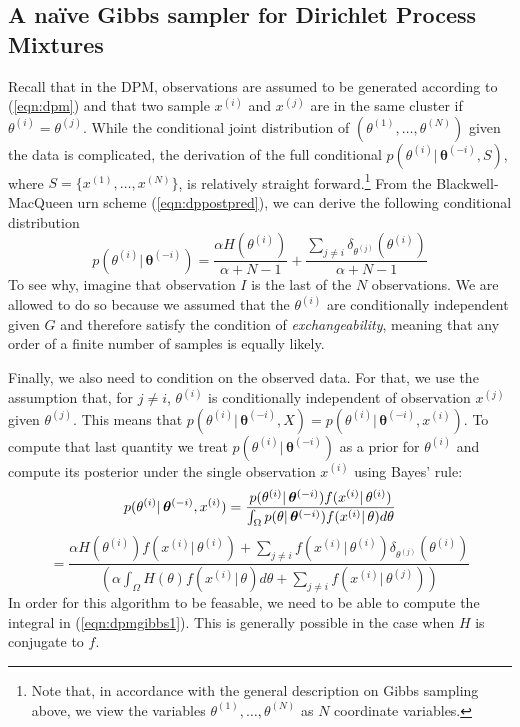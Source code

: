 \documentclass[final,3p,times,twocolumn]{elsarticle}
\let\bs\boldsymbol
\begin{document}
\subsection{A na{\"i}ve Gibbs sampler for Dirichlet Process Mixtures}
Recall that in the DPM, observations are assumed to be generated according to (\ref{eqn:dpm}) and that two sample $x^{(i)}$ and $x^{(j)}$ are in the same cluster if $\theta^{(i)}=\theta^{(j)}$.
While the conditional joint distribution of $(\theta^{(1)},\dots,\theta^{(N)})$ given the data is complicated, the derivation of the full conditional $p(\theta^{(i)}|\,\bs\theta^{(-i)},S)$, where $S=\{x^{(1)},\dots,x^{(N)}\}$, is relatively straight forward.\footnote{Note that, in accordance with the general description on Gibbs sampling above, we view the variables $\theta^{(1)},\dots,\theta^{(N)}$ as $N$ coordinate variables.}
From the Blackwell-MacQueen urn scheme (\ref{eqn:dppostpred}), we can derive the following conditional distribution
\begin{equation*}
p(\theta^{(i)}|\,\bs\theta^{(-i)}) = \frac{\alpha H(\theta^{(i)})}{\alpha+N-1} +\frac{\sum_{j\neq i}\delta_{\theta^{(j)}}(\theta^{(i)})}{\alpha+N-1}
\end{equation*}
To see why, imagine that observation $I$ is the last of the $N$ observations.
We are allowed to do so because we assumed that the $\theta^{(i)}$ are conditionally independent given $G$ and therefore satisfy the condition of \emph{exchangeability}, meaning that any order of a finite number of samples is equally likely.

Finally, we also need to condition on the observed data.
For that, we use the assumption that, for $j\neq i$, $\theta^{(i)}$ is conditionally independent of observation $x^{(j)}$ given $\theta^{(j)}$.
This means that $p(\theta^{(i)}|\,\bs\theta^{(-i)},X) = p(\theta^{(i)}|\,\bs\theta^{(-i)},x^{(i)})$.
To compute that last quantity we treat $p(\theta^{(i)}|\,\bs\theta^{(-i)})$ as a prior for $\theta^{(i)}$ and compute its posterior under the single observation $x^{(i)}$ using Bayes' rule:
\begin{equation}
\label{eqn:dpmgibbs1}
p(\theta^{(i)}|\,\bs\theta^{(-i)},x^{(i)}) = \frac{p(\theta^{(i)}|\,\bs\theta^{(-i)})f(x^{(i)}|\,\theta^{(i)})}{\int_\Omega p(\theta|\,\bs\theta^{(-i)})f(x^{(i)}|\,\theta) d\theta}\\
\end{equation}
\begin{equation*}
=\frac{\alpha H(\theta^{(i)})f(x^{(i)}|\,\theta^{(i)}) + \sum_{j\neq i}f(x^{(i)}|\,\theta^{(i)})\delta_{\theta^{(j)}}(\theta^{(i)})}{\left(\alpha\int_\Omega H(\theta)f(x^{(i)}|\,\theta)d\theta+\sum_{j \neq i}f(x^{(i)}|\,\theta^{(j)})\right)}
\end{equation*}
In order for this algorithm to be feasable, we need to be able to compute the integral in (\ref{eqn:dpmgibbs1}).
This is generally possible in the case when $H$ is conjugate to $f$.
\end{document}
